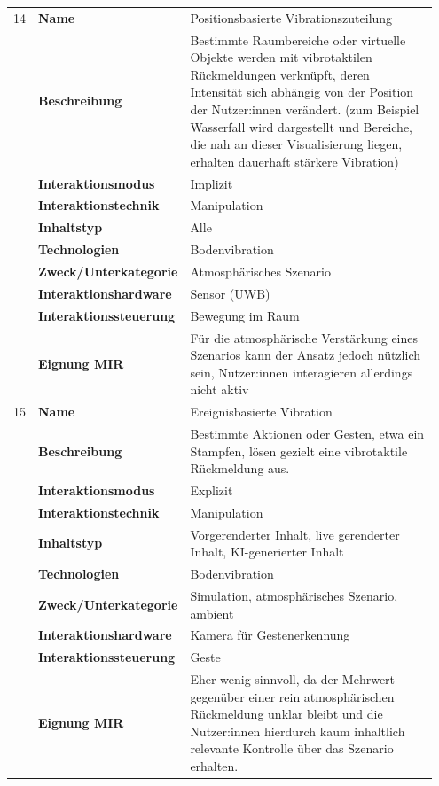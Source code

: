\begin{longtable}{p{0.03\linewidth} p{0.27\linewidth}
    >{\raggedright\arraybackslash}p{0.65\linewidth}}
    14  & \textbf{Name} & Positionsbasierte Vibrationszuteilung \\
        & \textbf{Beschreibung} & Bestimmte Raumbereiche oder virtuelle Objekte werden mit vibrotaktilen Rückmeldungen verknüpft, deren Intensität sich abhängig von der Position der Nutzer:innen verändert. (zum Beispiel Wasserfall wird dargestellt und Bereiche, die nah an dieser Visuali\-sierung liegen, erhalten dauerhaft stärkere Vibration) \\
        & \textbf{Interaktionsmodus} & Implizit \\
        & \textbf{Interaktionstechnik} & Manipulation \\
        & \textbf{Inhaltstyp} & Alle \\
        & \textbf{Technologien} & Bodenvibration \\
        & \textbf{Zweck/Unterkategorie} & Atmosphärisches Szenario \\
        & \textbf{Interaktionshardware} & Sensor (UWB) \\
        & \textbf{Interaktionssteuerung} & Bewegung im Raum \\
        & \textbf{Eignung MIR} & Für die atmosphärische Verstärkung eines Szenarios kann der Ansatz jedoch nützlich sein, Nutzer:innen interagieren allerdings nicht aktiv \\
    \midrule

    15  & \textbf{Name} & Ereignisbasierte Vibration \\
        & \textbf{Beschreibung} & Bestimmte Aktionen oder Gesten, etwa ein Stampfen, lösen gezielt eine vibrotaktile Rückmeldung aus. \\
        & \textbf{Interaktionsmodus} & Explizit \\
        & \textbf{Interaktionstechnik} & Manipulation \\
        & \textbf{Inhaltstyp} & Vorgerenderter Inhalt, live gerenderter Inhalt, KI-generierter Inhalt \\
        & \textbf{Technologien} & Bodenvibration \\
        & \textbf{Zweck/Unterkategorie} & Simulation, atmosphärisches Szenario, ambient \\
        & \textbf{Interaktionshardware} & Kamera für Gestenerkennung \\
        & \textbf{Interaktionssteuerung} & Geste \\
        & \textbf{Eignung MIR} & Eher wenig sinnvoll, da der Mehrwert gegenüber einer rein atmosphärischen Rückmeldung unklar bleibt und die Nutzer:innen hierdurch kaum inhaltlich relevante Kontrolle über das Szenario erhalten. \\
    \midrule


\end{longtable}